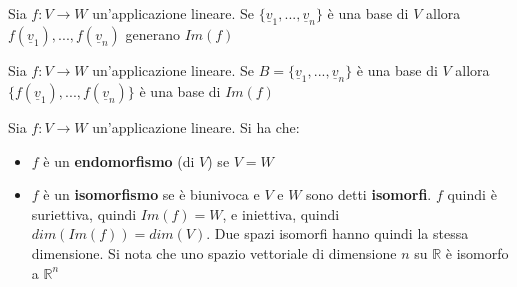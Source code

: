 \documentclass[a4paper,12pt, oneside]{book}
\begin{document}
\begin{teorema}
Sia $f:V\rightarrow W$ un'applicazione lineare. Se $\{\underline{v}_1,...,\underline{v}_n\}$ è una base di $V$ allora $f(\underline{v}_1),..., f(\underline{v}_n)$ generano $Im(f)$ 
\end{teorema}
\begin{teorema}
Sia $f:V\rightarrow W$ un'applicazione lineare. Se $B=\{\underline{v}_1,...,\underline{v}_n\}$ è una base di $V$ allora $\{f(\underline{v}_1),..., f(\underline{v}_n)\}$ è una base di $Im(f)$ 
\end{teorema}
\begin{definizione}
Sia $f:V\rightarrow W$ un'applicazione lineare. Si ha che:
\begin{itemize}
\item $f$ è un \textbf{endomorfismo} (di $V$) se $V=W$
\item $f$ è un \textbf{isomorfismo} se è biunivoca e $V$ e $W$ sono detti \textbf{isomorfi}. $f$ quindi è suriettiva, quindi $Im(f)=W$, e iniettiva, quindi $dim(Im(f))=dim(V)$. Due spazi isomorfi hanno quindi la stessa dimensione. Si nota che uno spazio vettoriale di dimensione $n$ su $\mathbb{R}$ è isomorfo a $\mathbb{R}^n$
\end{itemize}
\end{definizione}
\end{document}
